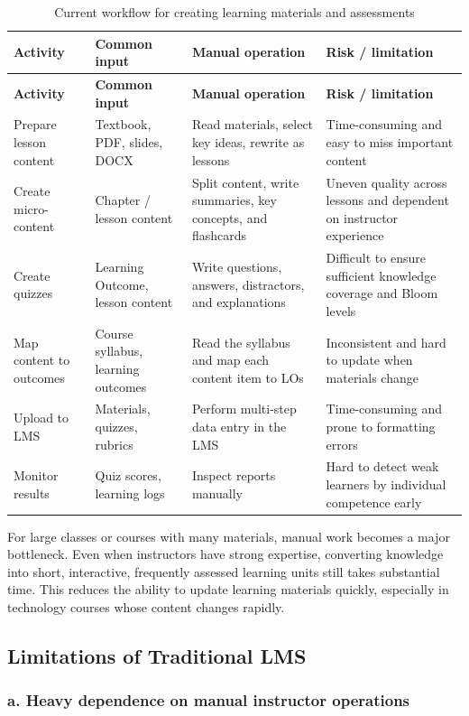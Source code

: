 \begin{longtable}{|p{3cm}|p{3cm}|p{4cm}|p{4cm}|}
\caption{Current workflow for creating learning materials and assessments}
\label{tab:quy-trinh-tao-hoc-lieu-hien-tai}\\
\hline
\textbf{Activity} & \textbf{Common input} & \textbf{Manual operation} & \textbf{Risk / limitation} \\
\hline
\endfirsthead
\hline
\textbf{Activity} & \textbf{Common input} & \textbf{Manual operation} & \textbf{Risk / limitation} \\
\hline
\endhead
Prepare lesson content & Textbook, PDF, slides, DOCX & Read materials, select key ideas, rewrite as lessons & Time-consuming and easy to miss important content \\
\hline
Create micro-content & Chapter / lesson content & Split content, write summaries, key concepts, and flashcards & Uneven quality across lessons and dependent on instructor experience \\
\hline
Create quizzes & Learning Outcome, lesson content & Write questions, answers, distractors, and explanations & Difficult to ensure sufficient knowledge coverage and Bloom levels \\
\hline
Map content to outcomes & Course syllabus, learning outcomes & Read the syllabus and map each content item to LOs & Inconsistent and hard to update when materials change \\
\hline
Upload to LMS & Materials, quizzes, rubrics & Perform multi-step data entry in the LMS & Time-consuming and prone to formatting errors \\
\hline
Monitor results & Quiz scores, learning logs & Inspect reports manually & Hard to detect weak learners by individual competence early \\
\hline
\end{longtable}

For large classes or courses with many materials, manual work becomes a major
bottleneck. Even when instructors have strong expertise, converting knowledge
into short, interactive, frequently assessed learning units still takes
substantial time. This reduces the ability to update learning materials quickly,
especially in technology courses whose content changes rapidly.

\subsection{Limitations of Traditional LMS}

\subsubsection*{a. Heavy dependence on manual instructor operations}

